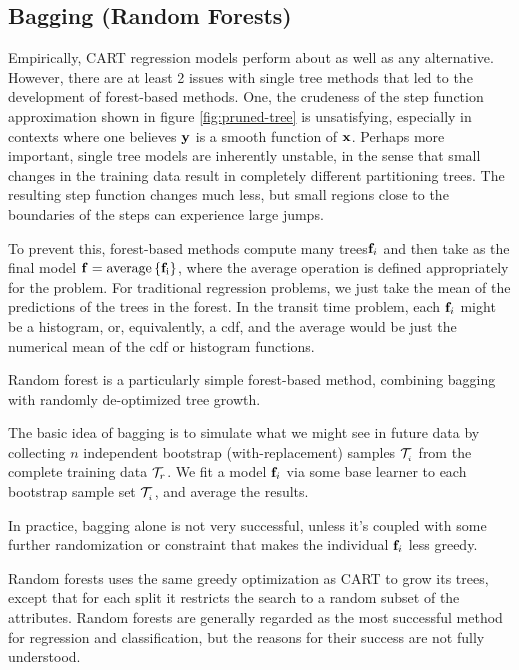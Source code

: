 \documentclass[10pt,openany]{article}
\numberwithin{definition}{section}
\numberwithin{example}{section}
\numberwithin{equation}{section}
\numberwithin{figure}{section}
\begin{document}
\subsection{Bagging (Random Forests)}

Empirically, CART regression models perform about as well as any alternative.
However, there are at least 2 issues with single tree methods that
led to the development of forest-based methods. One, the crudeness
of the step function approximation shown in figure \ref{fig:pruned-tree}
is unsatisfying, especially in contexts where one believes ${\mathbf y}$ is
a smooth function of ${\mathbf x}$. Perhaps more important, single tree models
are inherently unstable, in the sense that small changes in the training
data result in completely different partitioning trees. The resulting
step function changes much less, but small regions close to the boundaries
of the steps can experience large jumps.

To prevent this, forest-based methods compute many trees${\mathbf f}_{i}$
and then take as the final model ${\mathbf f}=\mathrm{{average}\left\{ {\mathbf f}_{i}\right\} }$,
where the average operation is defined appropriately for the problem.
For traditional regression problems, we just take the mean of the
predictions of the trees in the forest. In the transit time problem,
each ${\mathbf f}_{i}$ might be a histogram, or, equivalently, a cdf, and
the average would be just the numerical mean of the cdf or histogram
functions. 

Random forest is a particularly simple forest-based method, combining
bagging with randomly de-optimized tree growth.

The basic idea of bagging\label{ite:Bagging-(Random-Forests)} is
to simulate what we might see in future data by collecting $n$ independent
bootstrap (with-replacement) samples $\mathcal{T}_{_{i}}$ from the complete
training data $\mathcal{T}_r$. We fit a model ${\mathbf f}_{i}$ via some base
learner to each bootstrap sample set $\mathcal{T}_{_{i}}$, and average
the results.

In practice, bagging alone is not very successful, unless it's coupled
with some further randomization or constraint that makes the individual
${\mathbf f}_{i}$ less greedy. 

Random forests \cite{breiman-2001-machine-learning,hastie-tibshirani-friedman-2009}
uses the same greedy optimization as CART to grow its trees, except
that for each split it restricts the search to a random subset of
the attributes. Random forests are generally regarded as the most
successful method for regression and classification, but the reasons
for their success are not fully understood.
\end{document}
